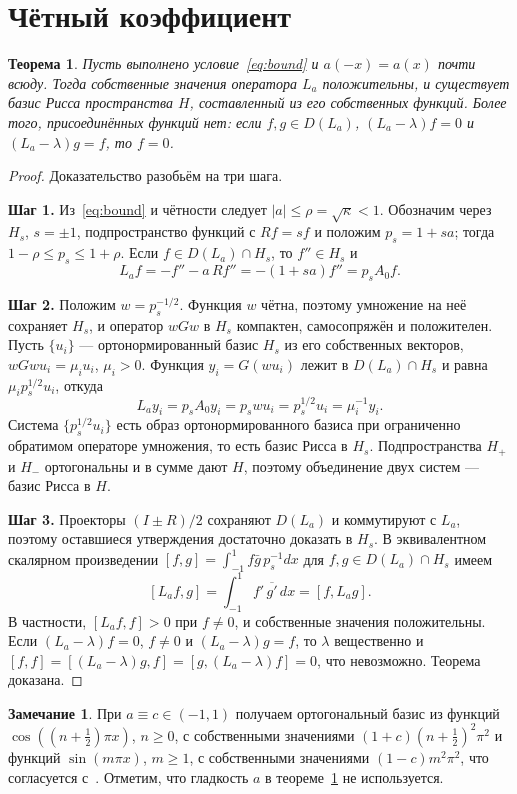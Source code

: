 \documentclass[12pt,a4paper]{article}
\newtheorem{theorem}{Теорема}
\theoremstyle{definition}
\newtheorem{remark}{Замечание}
\newcommand{\step}[1]{\smallskip\noindent\textbf{Шаг #1.}}
\newcommand{\abs}[1]{\lvert#1\rvert}
\begin{document}
\section{Чётный коэффициент}
\begin{theorem}\label{th:even}
Пусть выполнено условие~\eqref{eq:bound} и $a(-x)=a(x)$ почти всюду. Тогда собственные
значения оператора $L_a$ положительны, и существует базис Рисса пространства $H$,
составленный из его собственных функций. Более того, присоединённых функций нет: если
$f,g\in D(L_a)$, $(L_a-\lambda)f=0$ и $(L_a-\lambda)g=f$, то $f=0$.
\end{theorem}
\begin{proof}
Доказательство разобьём на три шага.

\step{1} Из~\eqref{eq:bound} и чётности следует $\abs a\le\rho=\sqrt\kappa<1$. Обозначим
через $H_s$, $s=\pm1$, подпространство функций с $Rf=sf$ и положим $p_s=1+sa$; тогда
$1-\rho\le p_s\le1+\rho$. Если $f\in D(L_a)\cap H_s$, то $f''\in H_s$ и
\[
 L_af=-f''-a\,Rf''=-(1+sa)f''=p_sA_0f .
\]

\step{2} Положим $w=p_s^{-1/2}$. Функция $w$ чётна, поэтому умножение на неё сохраняет
$H_s$, и оператор $wGw$ в $H_s$ компактен, самосопряжён и положителен. Пусть $\{u_i\}$
--- ортонормированный базис $H_s$ из его собственных векторов, $wGwu_i=\mu_iu_i$,
$\mu_i>0$. Функция $y_i=G(wu_i)$ лежит в $D(L_a)\cap H_s$ и равна
$\mu_ip_s^{1/2}u_i$, откуда
\[
 L_ay_i=p_sA_0y_i=p_swu_i=p_s^{1/2}u_i=\mu_i^{-1}y_i .
\]
Система $\{p_s^{1/2}u_i\}$ есть образ ортонормированного базиса при ограниченно обратимом
операторе умножения, то есть базис Рисса в $H_s$. Подпространства $H_+$ и $H_-$
ортогональны и в сумме дают $H$, поэтому объединение двух систем --- базис Рисса в $H$.

\step{3} Проекторы $(I\pm R)/2$ сохраняют $D(L_a)$ и коммутируют с $L_a$, поэтому
оставшиеся утверждения достаточно доказать в $H_s$. В эквивалентном скалярном
произведении $[f,g]=\int_{-1}^1f\bar g\,p_s^{-1}dx$ для $f,g\in D(L_a)\cap H_s$ имеем
\[
 [L_af,g]=\int_{-1}^1f'\,\overline{g'}\,dx=[f,L_ag] .
\]
В частности, $[L_af,f]>0$ при $f\ne0$, и собственные значения положительны. Если
$(L_a-\lambda)f=0$, $f\ne0$ и $(L_a-\lambda)g=f$, то $\lambda$ вещественно и
$[f,f]=[(L_a-\lambda)g,f]=[g,(L_a-\lambda)f]=0$, что невозможно. Теорема доказана.
\end{proof}

\begin{remark}\label{rem:const}
При $a\equiv c\in(-1,1)$ получаем ортогональный базис из функций
$\cos((n+\tfrac12)\pi x)$, $n\ge0$, с собственными значениями
$(1+c)(n+\tfrac12)^2\pi^2$ и функций $\sin(m\pi x)$, $m\ge1$, с собственными значениями
$(1-c)m^2\pi^2$, что согласуется с~\cite[теорема~4.1]{KS}. Отметим, что гладкость $a$ в
теореме~\ref{th:even} не используется.
\end{remark}
\end{document}
